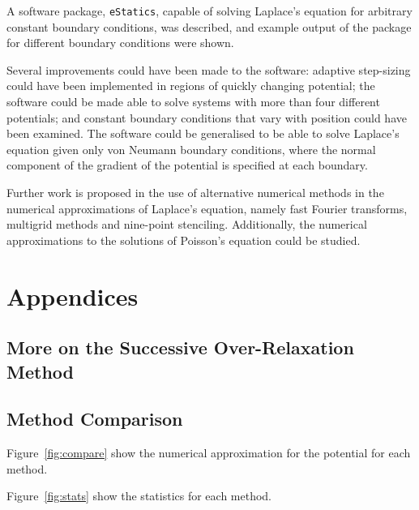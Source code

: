 \documentclass[11pt, a4paper]{article}
\begin{document}
A software package, \lstinline|eStatics|, capable of solving Laplace's equation for
arbitrary constant boundary conditions, was described, and example output of the
package for different boundary conditions were shown.

Several improvements could have been made to the software: adaptive step-sizing could
have been implemented in regions of quickly changing potential; the software could be
made able to solve systems with more than four different potentials; and constant boundary
conditions that vary with position could have been examined. The software could be
generalised to be able to solve Laplace's equation given only von Neumann boundary
conditions, where the normal component of the gradient of the potential is specified
at each boundary. 

Further work is proposed in the use of alternative numerical methods in the
numerical approximations of Laplace's equation, namely fast Fourier transforms,
multigrid methods and nine-point stenciling. Additionally, the numerical approximations
to the solutions of Poisson's equation could be studied.



\appendix
\section{Appendices}

\subsection{More on the Successive Over-Relaxation Method}

\subsection{Method Comparison}
\label{app:compare}
Figure~\ref{fig:compare} show the numerical approximation for the potential for each
method.


Figure~\ref{fig:stats} show the statistics for each method.
\end{document}
